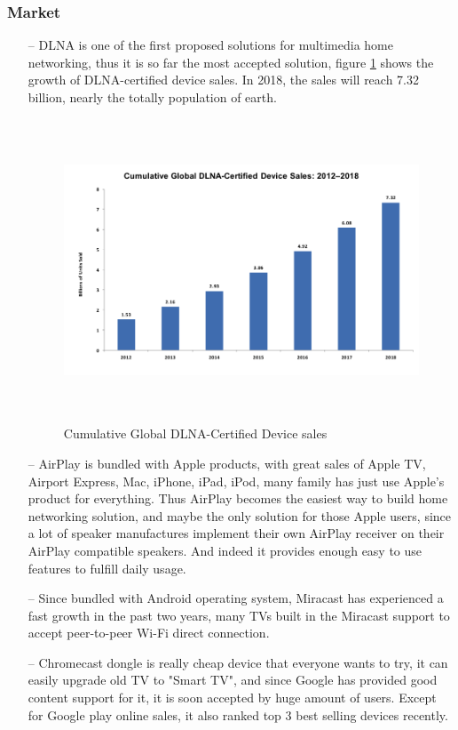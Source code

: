 \subsubsection{Market} 
\begin{itemize} 
\item[--]DLNA is one of the first proposed solutions for multimedia home 
networking, thus it is so far the most accepted solution, figure 
\ref{dlna_market} shows the growth of DLNA-certified device sales. In 2018, the 
sales will reach 7.32 billion, nearly the totally population of earth. 

\begin{figure}[htb] 
\centering \includegraphics[height=9cm]{charts/dlna_market} 
\caption{Cumulative Global DLNA-Certified Device sales \label{dlna_market}} 
\end{figure} 

\item[--]AirPlay is bundled with Apple products, with great sales of Apple TV, Airport Express, 
Mac, iPhone, iPad, iPod, many family has just use Apple's product for 
everything. Thus AirPlay becomes the easiest way to build home networking solution, and maybe the only solution for those 
Apple users, since a lot of speaker manufactures implement their own AirPlay 
receiver on their AirPlay compatible speakers. And indeed it provides enough easy to use features to fulfill daily usage. 
\item[--]Since bundled with Android operating system, Miracast has experienced a fast growth in 
the past two years, many TVs built in the Miracast support to accept peer-to-peer Wi-Fi direct connection. 
\item[--]Chromecast dongle is really cheap device that everyone wants to try, it can easily upgrade 
old TV to "Smart TV", and since Google has provided good content support for it, it is soon accepted 
by huge amount of users. Except for Google play online sales, it also ranked top 3 best selling devices 
recently. 
\end{itemize} 

